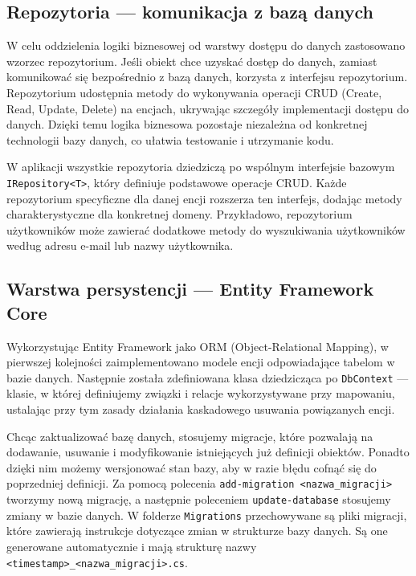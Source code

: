 \subsection{Repozytoria — komunikacja z bazą danych}

W celu oddzielenia logiki biznesowej od warstwy dostępu do danych zastosowano wzorzec repozytorium. Jeśli obiekt chce uzyskać dostęp do danych, zamiast komunikować się bezpośrednio z bazą danych, korzysta z interfejsu repozytorium. Repozytorium udostępnia metody do wykonywania operacji CRUD (Create, Read, Update, Delete) na encjach, ukrywając szczegóły implementacji dostępu do danych. Dzięki temu logika biznesowa pozostaje niezależna od konkretnej technologii bazy danych, co ułatwia testowanie i utrzymanie kodu.

W aplikacji wszystkie repozytoria dziedziczą po wspólnym interfejsie bazowym \texttt{IRepository<T>}, który definiuje podstawowe operacje CRUD. Każde repozytorium specyficzne dla danej encji rozszerza ten interfejs, dodając metody charakterystyczne dla konkretnej domeny. Przykładowo, repozytorium użytkowników może zawierać dodatkowe metody do wyszukiwania użytkowników według adresu e-mail lub nazwy użytkownika.

\subsection{Warstwa persystencji — Entity Framework Core}

Wykorzystując Entity Framework jako ORM (Object-Relational Mapping), w pierwszej kolejności zaimplementowano modele encji odpowiadające tabelom w bazie danych. Następnie została zdefiniowana klasa dziedzicząca po \texttt{DbContext} — klasie, w której definiujemy związki i relacje wykorzystywane przy mapowaniu, ustalając przy tym zasady działania kaskadowego usuwania powiązanych encji.

Chcąc zaktualizować bazę danych, stosujemy migracje, które pozwalają na dodawanie, usuwanie i modyfikowanie istniejących już definicji obiektów. Ponadto dzięki nim możemy wersjonować stan bazy, aby w razie błędu cofnąć się do poprzedniej definicji. Za pomocą polecenia \texttt{add-migration \textless nazwa\_migracji\textgreater} tworzymy nową migrację, a następnie poleceniem \texttt{update-database} stosujemy zmiany w bazie danych.
W folderze \texttt{Migrations} przechowywane są pliki migracji, które zawierają instrukcje dotyczące zmian w strukturze bazy danych. Są one generowane automatycznie i mają strukturę nazwy \texttt{\textless timestamp\textgreater\_\textless nazwa\_migracji\textgreater.cs}.

